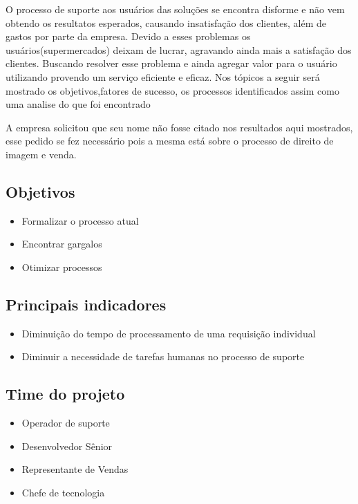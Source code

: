 \documentclass[11pt,a4paper]{article}
\begin{document}
		O processo de suporte aos usuários das soluções se encontra disforme e não vem obtendo
	os resultatos esperados, causando insatisfação dos clientes, além de gastos por parte da empresa.
	Devido a esses problemas os usuários(supermercados) deixam de lucrar, agravando ainda mais a satisfação
	dos clientes. Buscando resolver esse problema e ainda agregar valor para o usuário utilizando provendo
	um serviço eficiente e eficaz. 
	Nos tópicos a seguir será mostrado os objetivos,fatores de sucesso, os processos
	identificados assim como uma analise do que foi encontrado 
	
	A empresa solicitou que seu nome não fosse citado nos resultados aqui mostrados, esse pedido
	se fez necessário pois a mesma está sobre o processo de direito de imagem e venda.	
		
\subsection{Objetivos}
\begin{itemize}[noitemsep]
  \item Formalizar o processo atual
  \item Encontrar gargalos
  \item Otimizar processos
\end{itemize}

\subsection{Principais indicadores}
\begin{itemize}[noitemsep]
  \item Diminuição do tempo de processamento de uma requisição individual
  \item Diminuir a necessidade de tarefas humanas no processo de suporte
\end{itemize}

\subsection{Time do projeto}
\begin{itemize}[noitemsep]
  \item Operador de suporte
  \item Desenvolvedor Sênior
  \item Representante de Vendas
  \item Chefe de tecnologia
\end{itemize}
\end{document}
